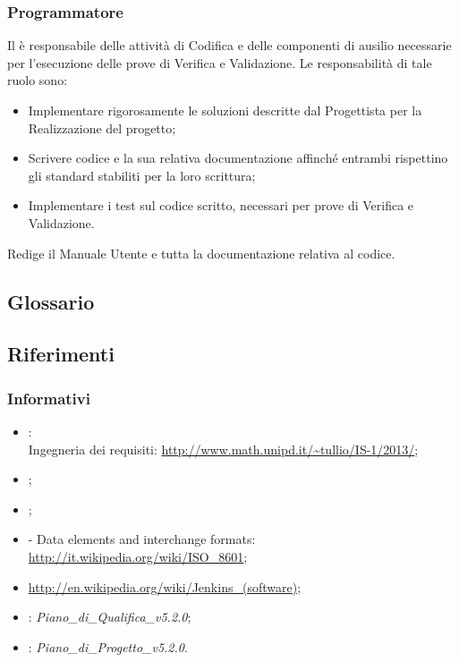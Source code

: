\subsubsection{Programmatore}

Il  è responsabile delle attivit\`{a} di Codifica e delle componenti di ausilio
necessarie per l'esecuzione delle prove di Verifica e Validazione. Le responsabilità di tale ruolo sono:
\begin{itemize}
\item Implementare rigorosamente le soluzioni descritte dal Progettista per la Realizzazione del progetto;
\item Scrivere codice e la sua relativa documentazione affinché entrambi rispettino gli standard stabiliti per la loro scrittura;
\item Implementare i test sul codice scritto, necessari per prove di Verifica e Validazione.
\end{itemize}
Redige il Manuale Utente e tutta la documentazione relativa al codice.

\subsection{Glossario}%
\label{1.3}
\Glossario{}

\subsection{Riferimenti} %
\label{1.4}
\subsubsection{Informativi}
\begin{itemize}
\item {}:\\
Ingegneria dei requisiti: \url{http://www.math.unipd.it/~tullio/IS-1/2013/};
\item {};\\
\item {};\\
\item {} - Data elements and interchange formats: \url{http://it.wikipedia.org/wiki/ISO\_8601};
\item {} \url{http://en.wikipedia.org/wiki/Jenkins_(software)};
\item {}: \emph{Piano\_di\_Qualifica\_v5.2.0};
\item {}: \emph{Piano\_di\_Progetto\_v5.2.0}.
\end{itemize}


